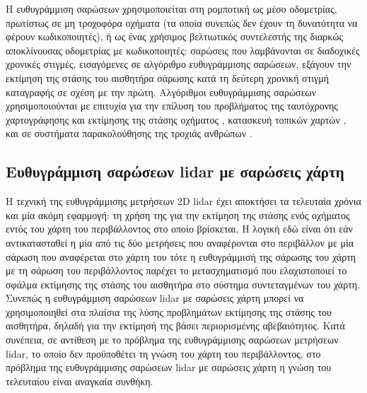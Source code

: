 \begin{gg_box}
\begin{remark}
\label{rem:sm_applications}
Η ευθυγράμμιση σαρώσεων χρησιμοποιείται στη ρομποτική ως μέσο οδομετρίας,
πρωτίστως σε μη τροχοφόρα οχήματα (τα οποία συνεπώς δεν έχουν τη δυνατότητα να
φέρουν κωδικοποιητές), ή ως ένας χρήσιμος βελτιωτικός συντελεστής της διαρκώς
αποκλίνουσας οδομετρίας με κωδικοποιητές: σαρώσεις που λαμβάνονται σε
διαδοχικές χρονικές στιγμές, εισαγόμενες σε αλγόριθμο ευθυγράμμισης
σαρώσεων, εξάγουν την εκτίμηση της στάσης του αισθητήρα σάρωσης κατά τη
δεύτερη χρονική στιγμή καταγραφής σε σχέση με την πρώτη. Αλγόριθμοι
ευθυγράμμισης σαρώσεων χρησιμοποιούνται με επιτυχία για την επίλυση του
προβλήματος της ταυτόχρονης χαρτογράφησης και εκτίμησης της στάσης οχήματος
\cite{Gutmann,Hahnel,Chieh-ChihWang}, κατασκευή τοπικών χαρτών
\cite{Lacroix2002a,Minguez,Montesano2008a}, και σε συστήματα παρακολούθησης της
τροχιάς ανθρώπων \cite{Schulz}.
\end{remark}
\end{gg_box}



\subsection{Ευθυγράμμιση σαρώσεων lidar με σαρώσεις χάρτη}
\label{subsec:01_01_02_6}

Η τεχνική της ευθυγράμμισης μετρήσεων 2D lidar έχει αποκτήσει τα τελευταία
χρόνια και μία ακόμη εφαρμογή: τη χρήση της για την εκτίμηση της στάσης ενός
οχήματος εντός του χάρτη του περιβάλλοντος στο οποίο βρίσκεται. Η λογική εδώ
είναι ότι εάν αντικατασταθεί η μία από τις δύο μετρήσεις που αναφέρονται στο
περιβάλλον με μία σάρωση που αναφέρεται στο χάρτη του τότε η ευθυγράμμισή
της σάρωσης του χάρτη με τη σάρωση του περιβάλλοντος παρέχει το μετασχηματισμό
που ελαχιστοποιεί το σφάλμα εκτίμησης της στάσης του αισθητήρα στο σύστημα
συντεταγμένων του χάρτη. Συνεπώς η ευθυγράμμιση σαρώσεων lidar με σαρώσεις
χάρτη μπορεί να χρησιμοποιηθεί στα πλαίσια της λύσης προβλημάτων εκτίμησης της
στάσης του αισθητήρα, δηλαδή για την εκτίμησή της βάσει περιορισμένης
αβεβαιότητος. Κατά συνέπεια, σε αντίθεση με το πρόβλημα της ευθυγράμμισης
σαρώσεων μετρήσεων lidar, το οποίο δεν προϋποθέτει τη γνώση του χάρτη του
περιβάλλοντος, στο πρόβλημα της ευθυγράμμισης σαρώσεων lidar με σαρώσεις χάρτη
η γνώση του τελευταίου είναι αναγκαία συνθήκη.


